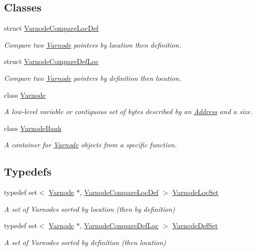 \subsection*{Classes}
\begin{DoxyCompactItemize}
\item 
struct \mbox{\hyperlink{struct_varnode_compare_loc_def}{Varnode\+Compare\+Loc\+Def}}
\begin{DoxyCompactList}\small\item\em Compare two \mbox{\hyperlink{class_varnode}{Varnode}} pointers by location then definition. \end{DoxyCompactList}\item 
struct \mbox{\hyperlink{struct_varnode_compare_def_loc}{Varnode\+Compare\+Def\+Loc}}
\begin{DoxyCompactList}\small\item\em Compare two \mbox{\hyperlink{class_varnode}{Varnode}} pointers by definition then location. \end{DoxyCompactList}\item 
class \mbox{\hyperlink{class_varnode}{Varnode}}
\begin{DoxyCompactList}\small\item\em A low-\/level variable or contiguous set of bytes described by an \mbox{\hyperlink{class_address}{Address}} and a size. \end{DoxyCompactList}\item 
class \mbox{\hyperlink{class_varnode_bank}{Varnode\+Bank}}
\begin{DoxyCompactList}\small\item\em A container for \mbox{\hyperlink{class_varnode}{Varnode}} objects from a specific function. \end{DoxyCompactList}\end{DoxyCompactItemize}
\subsection*{Typedefs}
\begin{DoxyCompactItemize}
\item 
typedef set$<$ \mbox{\hyperlink{class_varnode}{Varnode}} $\ast$, \mbox{\hyperlink{struct_varnode_compare_loc_def}{Varnode\+Compare\+Loc\+Def}} $>$ \mbox{\hyperlink{varnode_8hh_a0c764dbc00f376e51070e39a84ff6bc8}{Varnode\+Loc\+Set}}
\begin{DoxyCompactList}\small\item\em A set of Varnodes sorted by location (then by definition) \end{DoxyCompactList}\item 
typedef set$<$ \mbox{\hyperlink{class_varnode}{Varnode}} $\ast$, \mbox{\hyperlink{struct_varnode_compare_def_loc}{Varnode\+Compare\+Def\+Loc}} $>$ \mbox{\hyperlink{varnode_8hh_abf628bb127fd09a80a956b3fd54e61ff}{Varnode\+Def\+Set}}
\begin{DoxyCompactList}\small\item\em A set of Varnodes sorted by definition (then location) \end{DoxyCompactList}\end{DoxyCompactItemize}
